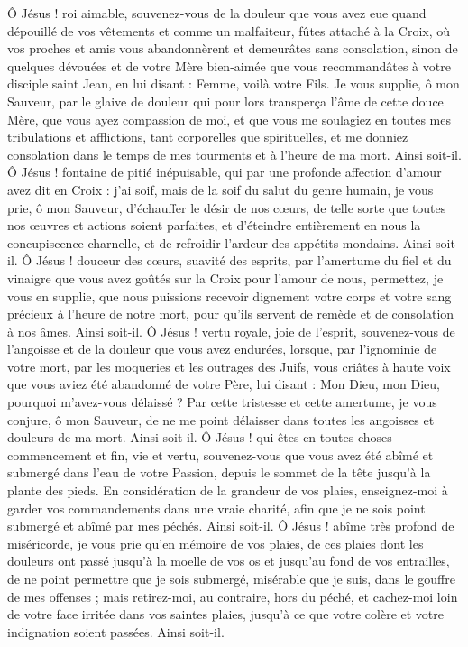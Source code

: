 \priere Ô Jésus ! roi aimable, souvenez-vous de la douleur que vous avez eue quand dépouillé de vos vêtements et comme un malfaiteur, fûtes attaché à la Croix, où vos proches et amis vous abandonnèrent et demeurâtes sans consolation, sinon de quelques dévouées et de votre Mère bien-aimée que vous recommandâtes à votre disciple saint Jean, en lui disant : Femme, voilà votre Fils. Je vous supplie, ô mon Sauveur, par le glaive de douleur qui pour lors transperça l’âme de cette douce Mère, que vous ayez compassion de moi, et que vous me soulagiez en toutes mes tribulations et afflictions, tant corporelles que spirituelles, et me donniez consolation dans le temps de mes tourments et à l’heure de ma mort. Ainsi soit-il.
\priere Ô Jésus ! fontaine de pitié inépuisable, qui par une profonde affection d’amour avez dit en Croix : j’ai soif, mais de la soif du salut du genre humain, je vous prie, ô mon Sauveur, d’échauffer le désir de nos cœurs, de telle sorte que toutes nos œuvres et actions soient parfaites, et d’éteindre entièrement en nous la concupiscence charnelle, et de refroidir l’ardeur des appétits mondains. Ainsi soit-il.
\priere Ô Jésus ! douceur des cœurs, suavité des esprits, par l’amertume du fiel et du vinaigre que vous avez goûtés sur la Croix pour l’amour de nous, permettez, je vous en supplie, que nous puissions recevoir dignement votre corps et votre sang précieux à l’heure de notre mort, pour qu’ils servent de remède et de consolation à nos âmes. Ainsi soit-il.
\priere Ô Jésus ! vertu royale, joie de l’esprit, souvenez-vous de l’angoisse et de la douleur que vous avez endurées, lorsque, par l’ignominie de votre mort, par les moqueries et les outrages des Juifs, vous criâtes à haute voix que vous aviez été abandonné de votre Père, lui disant : Mon Dieu, mon Dieu, pourquoi m’avez-vous délaissé ? Par cette tristesse et cette amertume, je vous conjure, ô mon Sauveur, de ne me point délaisser dans toutes les angoisses et douleurs de ma mort. Ainsi soit-il.
\priere Ô Jésus ! qui êtes en toutes choses commencement et fin, vie et vertu, souvenez-vous que vous avez été abîmé et submergé dans l’eau de votre Passion, depuis le sommet de la tête jusqu’à la plante des pieds. En considération de la grandeur de vos plaies, enseignez-moi à garder vos commandements dans une vraie charité, afin que je ne sois point submergé et abîmé par mes péchés. Ainsi soit-il.
\priere Ô Jésus ! abîme très profond de miséricorde, je vous prie qu’en mémoire de vos plaies, de ces plaies dont les douleurs ont passé jusqu’à la moelle de vos os et jusqu’au fond de vos entrailles, de ne point permettre que je sois submergé, misérable que je suis, dans le gouffre de mes offenses ; mais retirez-moi, au contraire, hors du péché, et cachez-moi loin de votre face irritée dans vos saintes plaies, jusqu’à ce que votre colère et votre indignation soient passées. Ainsi soit-il.
